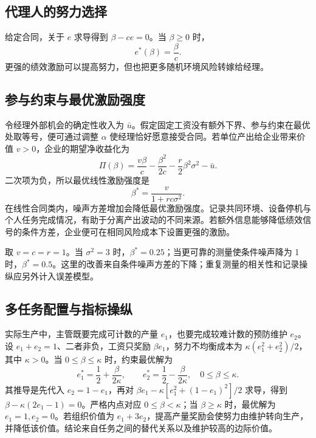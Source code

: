 \subsection{代理人的努力选择}
给定合同，关于 \(e\) 求导得到 \(\beta-ce=0\)。当 \(\beta\ge0\) 时，
\[
e^*(\beta)=\frac{\beta}{c}.
\]
更强的绩效激励可以提高努力，但也把更多随机环境风险转嫁给经理。

\subsection{参与约束与最优激励强度}
令经理外部机会的确定性收入为 \(\bar u\)。假定固定工资没有额外下界、参与约束在最优处取等号，便可通过调整 \(\alpha\) 使经理恰好愿意接受合同。若单位产出给企业带来价值 \(v>0\)，企业的期望净收益化为
\[
\Pi(\beta)=\frac{v\beta}{c}
-\frac{\beta^2}{2c}
-\frac r2\beta^2\sigma^2-\bar u.
\]
二次项为负，所以最优线性激励强度是
\[
\beta^*=\frac{v}{1+rc\sigma^2}.
\]
在线性合同类内，噪声方差增加会降低最优激励强度。记录共同环境、设备停机与个人任务完成情况，有助于分离产出波动的不同来源。若额外信息能够降低绩效信号的条件方差，企业便可在相同风险成本下设置更强的激励。

\begin{example}[数据质量与激励强度]
取 \(v=c=r=1\)。当 \(\sigma^2=3\) 时，\(\beta^*=0.25\)；当更可靠的测量使条件噪声降为 1 时，\(\beta^*=0.5\)。这里的改善来自条件噪声方差的下降；重复测量的相关性和记录操纵应另外计入误差模型。
\end{example}

\subsection{多任务配置与指标操纵}
实际生产中，主管既要完成可计数的产量 \(e_1\)，也要完成较难计数的预防维护 \(e_2\)。设 \(e_1+e_2=1\)、二者非负，工资只奖励 \(\beta e_1\)，努力不均衡成本为 \(\kappa(e_1^2+e_2^2)/2\)，其中 \(\kappa>0\)。当 \(0\le\beta\le\kappa\) 时，约束最优解为
\[
e_1^*=\frac12+\frac{\beta}{2\kappa},
\qquad e_2^*=\frac12-\frac{\beta}{2\kappa},
\quad 0\le\beta\le\kappa.
\]
其推导是先代入 \(e_2=1-e_1\)，再对 \(\beta e_1-\kappa[e_1^2+(1-e_1)^2]/2\) 求导，得到 \(\beta-\kappa(2e_1-1)=0\)。严格内点对应 \(0\le\beta<\kappa\)；当 \(\beta\ge\kappa\) 时，最优解为 \(e_1=1,e_2=0\)。若组织价值为 \(e_1+3e_2\)，提高产量奖励会使努力由维护转向生产，并降低该价值。结论来自任务之间的替代关系以及维护较高的边际价值。

